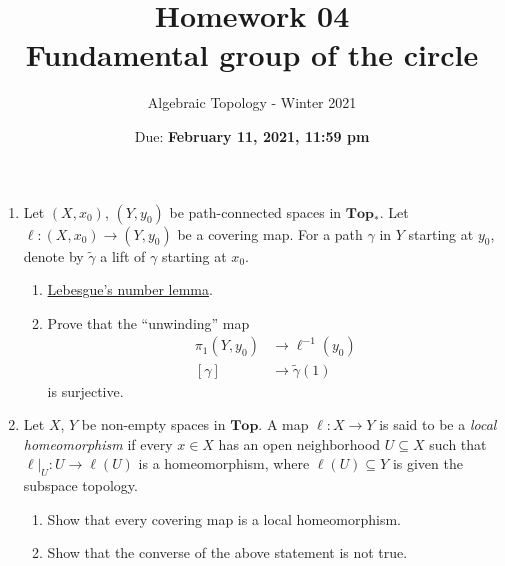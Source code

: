 \documentclass{article}
\title{Homework 04 \\ Fundamental group of the circle}
\author{Algebraic Topology - Winter 2021}
\date{Due: \textbf{February 11, 2021, 11:59 pm}}
\begin{document}
\maketitle

\begin{enumerate}
    \item 
    Let $(X,x_0)$, $(Y,y_0)$ be path-connected spaces in $\mathbf{Top}_*$.
    Let $\ell: (X,x_0) \to (Y,y_0)$ be a covering map. For a path $\gamma$ in $Y$ starting at $y_0$, denote by $\widetilde{\gamma}$ a lift of $\gamma$ starting at $x_0$.
    \begin{enumerate}
        \item
        \href{https://en.wikipedia.org/wiki/Lebesgue\%27s_number_lemma}{Lebesgue's number lemma}.
        \item Prove that the ``unwinding'' map 
        \begin{align*}
            \pi_1(Y,y_0) & \to \ell^{-1}(y_0) \\ 
            [\gamma] &\to \widetilde{\gamma}(1)
        \end{align*}
        is surjective.
    \end{enumerate}
    
    \item 
    Let $X$, $Y$ be non-empty spaces in $\mathbf{Top}$. A map $\ell: X \to Y$ is said to be a \emph{local homeomorphism} if every $x \in X$ has an open neighborhood $U \subseteq X$ such that $\ell |_U : U \to \ell(U)$ is a homeomorphism, where $\ell(U) \subseteq Y$ is given the subspace topology. 
    \begin{enumerate}
        \item Show that every covering map is a local homeomorphism.
        \item Show that the converse of the above statement is not true.
    \end{enumerate}
    

\end{enumerate}
\end{document}
